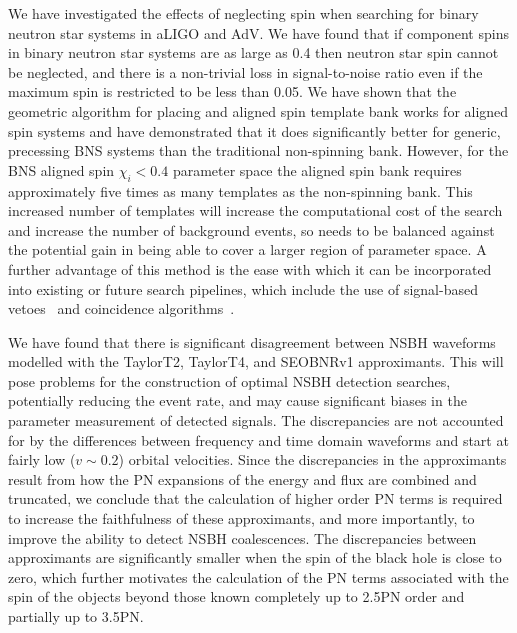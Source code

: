 We have investigated the effects of neglecting spin when
searching for binary neutron star systems in aLIGO and AdV. We have found
that if component spins in binary neutron star systems are as large as 0.4
then neutron star spin cannot be neglected, and there is a non-trivial loss in
signal-to-noise ratio even if the maximum spin is restricted to be less than
0.05. We have shown that the geometric algorithm for placing and
aligned spin template bank works for
aligned spin systems and have demonstrated that it does significantly better
for generic, precessing BNS systems than the traditional non-spinning bank.
However, for the BNS aligned spin $\chi_i < 0.4$ parameter space the aligned
spin bank requires approximately five times as many templates as the
non-spinning bank. This increased number of templates will increase the
computational cost of the search and increase the number of background events,
so needs to be balanced against the potential gain in being able to cover a
larger region of parameter space. A further advantage of this method is the ease
with which it can be incorporated into existing or future search
pipelines, which include the use of signal-based vetoes~\cite{Allen:2004gu}
and coincidence algorithms~\cite{Robinson:2008}.

We have found that there is significant disagreement between \ac{NSBH}
waveforms modelled with the TaylorT2, TaylorT4, and SEOBNRv1 approximants. 
This will pose problems for the construction of optimal NSBH detection searches, 
potentially reducing the event rate, 
and may cause significant biases in the parameter measurement of detected signals.
The discrepancies are not accounted for by the differences between
frequency and time domain waveforms and start at fairly low ($v \sim 0.2$) orbital velocities.
Since the discrepancies in the approximants result from how the \ac{PN} expansions of the energy and flux
are combined and truncated, we conclude
that the calculation of higher order \ac{PN} terms is required to increase the
faithfulness of these approximants, and more importantly, to improve the
ability to detect \ac{NSBH} coalescences. The
discrepancies between approximants are significantly smaller when the spin of
the black hole is close to zero, which further motivates the calculation of the
\ac{PN} terms associated with the spin of the objects beyond those known
completely up to 2.5\ac{PN} order and partially up to 3.5\ac{PN}.

